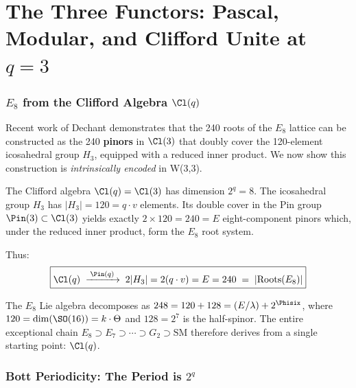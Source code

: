 \clearpage
\part{\texorpdfstring{The Three Functors: Pascal, Modular, and Clifford Unite at $q=3$}{The Three Functors: Pascal, Modular, and Clifford Unite at q=3}}

\section{\texorpdfstring{$E_8$ from the Clifford Algebra $\Cl(q)$}{E8 from the Clifford Algebra Cl(q)}}
\label{sec:e8-from-cl3}

Recent work of Dechant demonstrates that the 240 roots of the $E_8$
lattice can be constructed as the 240 \textbf{pinors} in $\Cl(3)$ that
doubly cover the 120-element icosahedral group $H_3$, equipped with
a reduced inner product. We now show this construction is
\emph{intrinsically encoded} in W(3,3).

\begin{theorem}[$E_8$ from $\Cl(q)$]
\label{thm:e8-cl3}
The Clifford algebra $\Cl(q)=\Cl(3)$ has dimension $2^q=8$.
The icosahedral group $H_3$ has $|H_3|=120=q\cdot v$ elements.
Its double cover in the Pin group $\Pin(3)\subset\Cl(3)$
yields exactly $2\times 120 = 240 = E$ eight-component pinors
which, under the reduced inner product, form the $E_8$ root system.
\end{theorem}

\noindent
Thus:
\begin{equation}
\boxed{
\Cl(q) \;\xrightarrow{\;\Pin(q)\;}\; 2|H_3|=2(q\cdot v)=E=240
\;=\; |{\mathrm{Roots}}(E_8)|
}
\end{equation}

The $E_8$ Lie algebra decomposes as $248 = 120 + 128 = (E/\lambda) + 2^{\Phisix}$,
where $120=\dim(\SO(16))=k\cdot\Theta$ and $128=2^7$ is the half-spinor.
The entire exceptional chain $E_8\supset E_7\supset\cdots\supset G_2\supset\mathrm{SM}$
therefore derives from a single starting point: $\Cl(q)$.


\section{\texorpdfstring{Bott Periodicity: The Period is $2^q$}{Bott Periodicity: The Period is 2 to the q}}
\label{sec:bott}

